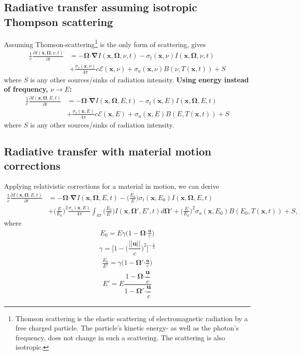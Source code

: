 \documentclass[10pt,letterpaper,notitlepage]{article}
\numberwithin{equation}{section}
\newcommand{\Omegabf}{\mathbf{\Omega}}
\newcommand{\bnabla}{\boldsymbol{\nabla}}
\newcommand{\position}{\mathbf{x}}
\newcommand{\dotp}{\boldsymbol{\cdot}}
\newcommand{\RadE}{\mathcal{E}}
\newcommand{\beqn}{\begin{equation}\begin{aligned}}
\newcommand{\eeqn}{\end{aligned}\end{equation}}
\begin{document}
\subsection{Radiative transfer assuming isotropic Thompson scattering}
Assuming Thomson-scattering\footnote{Thomson scattering is the elastic scattering of electromagnetic radiation by a free charged particle. The particle's kinetic energy- as well as the photon's frequency, does not change in such a scattering. The scattering is also isotropic.} is the only form of scattering, gives
\beqn 
\frac{1}{c} \frac{\partial I(\position, \Omegabf, \nu, t)}{\partial t} &=
-\Omegabf \dotp \bnabla I(\position, \Omegabf, \nu, t)
- \sigma_t(\position,\nu) I(\position, \Omegabf, \nu, t) \\
&+ \frac{\sigma_s(\position,\nu)}{4\pi} c \RadE(\position, \nu)
+ \sigma_a(\position,\nu) B(\nu,T(\position, t))+S
\eeqn 
where $S$ is any other sources/sinks of radiation intensity. 
\newline
\newline
\textbf{Using energy instead of frequency, $\nu\to E$:}
\beqn 
\frac{1}{c} \frac{\partial I(\position, \Omegabf, E, t)}{\partial t} &=
-\Omegabf \dotp \bnabla I(\position, \Omegabf, E, t)
- \sigma_t(\position,E) I(\position, \Omegabf, E, t) \\
&+ \frac{\sigma_s(\position,E)}{4\pi} c \RadE(\position, E)
+ \sigma_a(\position,E) B(E,T(\position, t))+S
\eeqn 
where $S$ is any other sources/sinks of radiation intensity. 

\subsection{Radiative transfer with material motion corrections}
Applying relativistic corrections for a material in motion, we can derive 
\beqn 
\frac{1}{c} \frac{\partial I(\position, \Omegabf, E, t)}{\partial t} &=
-\Omegabf \dotp \bnabla I(\position, \Omegabf, E, t)
- \biggr(\frac{E_0}{E}\biggr)\sigma_t(\position,E_0) I(\position, \Omegabf, E, t) \\
&+ \biggr(\frac{E}{E_0}\biggr)^2\frac{\sigma_s(\position,E)}{4\pi} \int_{4\pi} \biggr(\frac{E_0}{E'}\biggr) I(\position, \Omegabf', E', t) d\Omegabf'
+ \biggr(\frac{E}{E_0}\biggr)^2 \sigma_a(\position,E_0) B(E_0,T(\position, t))+S,
\eeqn 
where
\beqn 
E_0 = E \gamma \biggr(1-\Omegabf \dotp \frac{\mathbf{u}}{c}\biggr)
\eeqn 
\beqn 
\gamma = \biggr[ 1-\biggr(\dfrac{||\mathbf{u}||}{c}\biggr)^2 \biggr]^{-\frac{1}{2}}
\eeqn 
\beqn 
\frac{E_0}{E'} = \gamma \biggr(1-\Omegabf' \dotp \frac{\mathbf{u}}{c} \biggr)
\eeqn 
\beqn 
E' = E \dfrac{1-\Omegabf \dotp \dfrac{\mathbf{u}}{c}}{1-\Omegabf' \dotp \dfrac{\mathbf{u}}{c}}
\eeqn 
\end{document}
